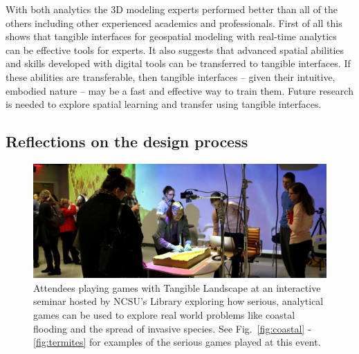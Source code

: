\documentclass[prodmode,acmtochi]{acmsmall} %
\begin{document}
With both analytics the 3D modeling experts 
performed better than all of the others
including other experienced academics and professionals. 
%
First of all this shows that 
tangible interfaces for geospatial modeling with real-time analytics 
can be effective tools for experts. 
%
It also suggests that advanced spatial abilities and skills
developed with digital tools can be transferred
to tangible interfaces. 
%
If these abilities are transferable, 
then tangible interfaces 
-- given their intuitive, embodied nature --
may be a fast and effective way to train them.
%
Future research is needed to explore
spatial learning and transfer
using tangible interfaces. 


\subsection{Reflections on the design process} 

% 
%


\begin{figure}
\begin{center}
		\includegraphics[width=\textwidth]{images/case_studies/coffee_and_viz.jpg}
	\caption{Attendees playing games with Tangible Landscape at an interactive seminar hosted by NCSU's Library exploring how serious, analytical games can be used to explore real world problems like coastal flooding and the spread of invasive species. See Fig.~\ref{fig:coastal} - \ref{fig:termites} for examples of the serious games played at this event.}
	\label{fig:coffee_and_viz}
\end{center}
\end{figure}
\end{document}
